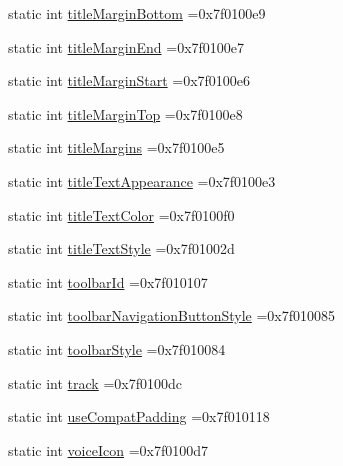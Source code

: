 \begin{DoxyCompactItemize}
\item 
static int \hyperlink{classandroid_1_1support_1_1v7_1_1mediarouter_1_1R_1_1attr_aac9daa5285fa9308e4afab0e650b8f85}{title\+Margin\+Bottom} =0x7f0100e9
\item 
static int \hyperlink{classandroid_1_1support_1_1v7_1_1mediarouter_1_1R_1_1attr_a52541b0c2f637e47a0aec99ecf3a1016}{title\+Margin\+End} =0x7f0100e7
\item 
static int \hyperlink{classandroid_1_1support_1_1v7_1_1mediarouter_1_1R_1_1attr_a8a22c5883e8405e7b89aaf289111bafb}{title\+Margin\+Start} =0x7f0100e6
\item 
static int \hyperlink{classandroid_1_1support_1_1v7_1_1mediarouter_1_1R_1_1attr_a5bb3e1cd77d6b3ef36342df2fc7f7a4b}{title\+Margin\+Top} =0x7f0100e8
\item 
static int \hyperlink{classandroid_1_1support_1_1v7_1_1mediarouter_1_1R_1_1attr_a6c4fad1182a34cacceda1bb43c2edf65}{title\+Margins} =0x7f0100e5
\item 
static int \hyperlink{classandroid_1_1support_1_1v7_1_1mediarouter_1_1R_1_1attr_a4829358bbcfaace73a8abe57ee662d20}{title\+Text\+Appearance} =0x7f0100e3
\item 
static int \hyperlink{classandroid_1_1support_1_1v7_1_1mediarouter_1_1R_1_1attr_ac6dbb1219e8f190a50d809cb15b2c6cf}{title\+Text\+Color} =0x7f0100f0
\item 
static int \hyperlink{classandroid_1_1support_1_1v7_1_1mediarouter_1_1R_1_1attr_af0515fea4fdf16c1b914b839db3e8168}{title\+Text\+Style} =0x7f01002d
\item 
static int \hyperlink{classandroid_1_1support_1_1v7_1_1mediarouter_1_1R_1_1attr_a5a15482337bdff53ccc3d196da6e123f}{toolbar\+Id} =0x7f010107
\item 
static int \hyperlink{classandroid_1_1support_1_1v7_1_1mediarouter_1_1R_1_1attr_ad3987a159610886a0a354b684bfd9c76}{toolbar\+Navigation\+Button\+Style} =0x7f010085
\item 
static int \hyperlink{classandroid_1_1support_1_1v7_1_1mediarouter_1_1R_1_1attr_a1ce19f1edb30dec57298428b39ef2a46}{toolbar\+Style} =0x7f010084
\item 
static int \hyperlink{classandroid_1_1support_1_1v7_1_1mediarouter_1_1R_1_1attr_a13264085643a0ef36c13712084481c13}{track} =0x7f0100dc
\item 
static int \hyperlink{classandroid_1_1support_1_1v7_1_1mediarouter_1_1R_1_1attr_a5a5595096c2291118e9efc9446b81f89}{use\+Compat\+Padding} =0x7f010118
\item 
static int \hyperlink{classandroid_1_1support_1_1v7_1_1mediarouter_1_1R_1_1attr_a123ea20b20287eb9f23c52cb995886c4}{voice\+Icon} =0x7f0100d7

\end{DoxyCompactItemize}

